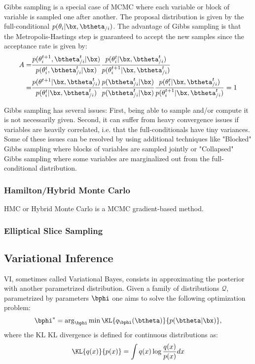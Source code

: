 Gibbs sampling is a special case of \ac{MCMC} where each variable or block of variable is sampled one after another.
The proposal distribution is given by the full-conditional $p(\theta_i|\bx,\btheta_{/i})$.
The advantage of Gibbs sampling is that the Metropolis-Hastings step is guaranteed to accept the new samples since the acceptance rate is given by:
\begin{align*}
    A =& \frac{p(\theta^{t+1}_i,\btheta^t_{/i}|\bx)}{p(\theta^t_i,\btheta^t_{/i}|\bx)}\frac{p(\theta^t_i|\bx,\btheta^{t}_{/i})}{p(\theta^{t+1}_i|\bx,\btheta^t_{/i})}\\
    =& \frac{p(\theta^{t+1}|\bx, \btheta^{t}_{/i})}{p(\theta^t_i|\bx,\btheta^t_{/i})}\frac{p(\btheta^t_{/i}|\bx)}{p(\btheta^t_{/i}|\bx)}\frac{p(\theta^t_i|\bx,\btheta^{t}_{/i})}{p(\theta^{t+1}_i|\bx,\btheta^t_{/i})} = 1
\end{align*}

Gibbs sampling has several issues:
First, being able to sample and/or compute it is not necessarily given.
Second, it can suffer from heavy convergence issues if variables are heavily correlated, i.e. that the full-conditionals have tiny variances.
Some of these issues can be resolved by using additional techniques like "Blocked" Gibbs sampling where blocks of variables are sampled jointly or "Collapsed" Gibbs sampling where some variables are marginalized out from the full-conditional distribution. 

\subsubsection{Hamilton/Hybrid Monte Carlo}

\acf{HMC} or Hybrid Monte Carlo \cite{betancourt2017conceptual} is a \ac{MCMC} gradient-based method.


\subsubsection{Elliptical Slice Sampling}



\subsection{Variational Inference}

\acf{VI}, sometimes called Variational Bayes, consists in approximating the posterior with another parametrized distribution.
Given a family of distributions $\mathcal{Q}$, parametrized by parameters $\bphi$ one aims to solve the following optimization problem:
\begin{align}
\bphi^* = \arg_{\bphi}\min \KL{q_{\bphi}(\btheta)}{p(\btheta|\bx)},
\label{eq:prob_VI}
\end{align}
where the $\mathrm{KL}$ \ac{KL} divergence is defined for continuous distributions as:
\begin{align}
\KL{q(x)}{p(x)} = \int q(x) \log \frac{q(x)}{p(x)}dx
\end{align}


